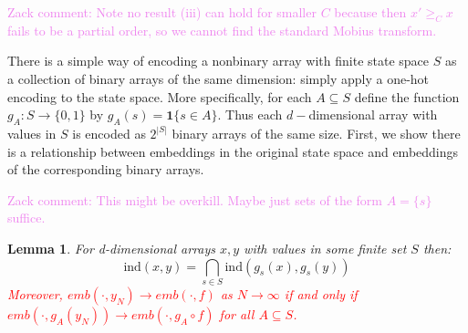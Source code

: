 \documentclass[11pt,oneside,reqno]{article}
\theoremstyle{plain}
\newtheorem{lemma}[theorem]{Lemma}
\theoremstyle{definition}
\numberwithin{equation}{section}
\renewcommand{\geq}{\geqslant}
\newcommand{\red}{\textcolor{red}}
\newcommand{\ind}{\mathbf{1}}
\newcommand{\zack}[1]{\textcolor{Violet}{Zack comment: #1}}
\begin{document}
\zack{Note no result (iii) can hold for smaller $C$ because then $x' \geq_C x$ fails to be a partial order, so we cannot find the standard Mobius transform.}



\noindent There is a simple way of encoding a nonbinary array with finite state space $S$ as a collection of binary arrays of the same dimension: simply apply a one-hot encoding to the state space. More specifically, for each $A \subseteq S$ define the function $g_A: S \to \{0,1\}$ by $g_A(s) = \ind \{s \in A\}$. Thus each $d-$dimensional array with values in $S$ is encoded as $2^{|S|}$ binary arrays of the same size. First, we show there is a relationship between embeddings in the original state space and embeddings of the corresponding binary arrays.

\zack{This might be overkill. Maybe just sets of the form $A = \{s\}$ suffice.}


\begin{lemma}
    For d-dimensional arrays $x,y$ with values in some finite set $S$ then:
        \[\text{ind}(x,y) = \bigcap_{s \in S} \text{ind}(g_s(x), g_s(y))\]
    \noindent \red{Moreover, $emb( \cdot ,y_N) \to emb( \cdot , f)$ as $N \to \infty$ if and only if $emb(\cdot, g_A(y_N)) \to emb(\cdot, g_A \circ f)$ for all $A \subseteq S$.} 

    \label{lem:reducing_nonbinary_conv_to_binary}
\end{lemma}
\end{document}
